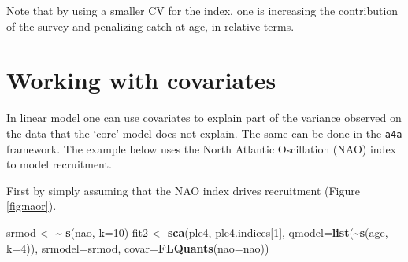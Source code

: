 \documentclass[
]{book}
\newenvironment{Shaded}{\begin{snugshade}}{\end{snugshade}}
\newcommand{\AttributeTok}[1]{\textcolor[rgb]{0.13,0.29,0.53}{#1}}
\newcommand{\ConstantTok}[1]{\textcolor[rgb]{0.56,0.35,0.01}{#1}}
\newcommand{\DecValTok}[1]{\textcolor[rgb]{0.00,0.00,0.81}{#1}}
\newcommand{\ErrorTok}[1]{\textcolor[rgb]{0.64,0.00,0.00}{\textbf{#1}}}
\newcommand{\FunctionTok}[1]{\textcolor[rgb]{0.13,0.29,0.53}{\textbf{#1}}}
\newcommand{\NormalTok}[1]{#1}
\newcommand{\OtherTok}[1]{\textcolor[rgb]{0.56,0.35,0.01}{#1}}
\newcommand{\SpecialCharTok}[1]{\textcolor[rgb]{0.81,0.36,0.00}{\textbf{#1}}}
\newcommand{\StringTok}[1]{\textcolor[rgb]{0.31,0.60,0.02}{#1}}
\begin{document}
Note that by using a smaller CV for the index, one is increasing the contribution of the survey and penalizing catch at age, in relative terms.

\hypertarget{working-with-covariates}{%
\section{Working with covariates}\label{working-with-covariates}}

In linear model one can use covariates to explain part of the variance observed on the data that the `core' model does not explain. The same can be done in the \texttt{a4a} framework. The example below uses the North Atlantic Oscillation (NAO) index to model recruitment.

\begin{Shaded}
\end{Shaded}

First by simply assuming that the NAO index drives recruitment (Figure \ref{fig:naor}).

\begin{Shaded}
\begin{Highlighting}[]
\NormalTok{srmod }\OtherTok{\textless{}{-}} \ErrorTok{\textasciitilde{}} \FunctionTok{s}\NormalTok{(nao, }\AttributeTok{k=}\DecValTok{10}\NormalTok{)}
\NormalTok{fit2 }\OtherTok{\textless{}{-}} \FunctionTok{sca}\NormalTok{(ple4, ple4.indices[}\DecValTok{1}\NormalTok{], }\AttributeTok{qmodel=}\FunctionTok{list}\NormalTok{(}\SpecialCharTok{\textasciitilde{}}\FunctionTok{s}\NormalTok{(age, }\AttributeTok{k=}\DecValTok{4}\NormalTok{)), }\AttributeTok{srmodel=}\NormalTok{srmod,}
       \AttributeTok{covar=}\FunctionTok{FLQuants}\NormalTok{(}\AttributeTok{nao=}\NormalTok{nao))}
\end{Highlighting}
\end{Shaded}
\end{document}
